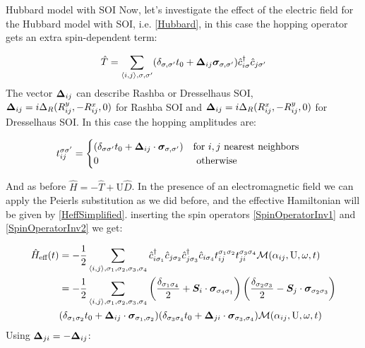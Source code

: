 \begin{section}{Hubbard model with SOI}
\label{Section3HubbardSOI}
Now, let's investigate the effect of the electric field for the Hubbard model with SOI, i.e. \ref{Hubbard}, in this case the hopping operator gets an extra spin-dependent term:

\begin{equation}
\hat{T} = \sum_{\langle i,j \rangle, \sigma, \sigma'}(\delta_{\sigma, \sigma'} t_0 + \boldsymbol{\Delta}_{ij} \boldsymbol{\sigma}_{\sigma, \sigma'})\hat{c}_{i \sigma}^\dagger \hat{c}_{j \sigma'}
\end{equation}
The vector $\boldsymbol{\Delta}_{ij}$ can describe Rashba or Dresselhaus SOI, $\boldsymbol{\Delta}_{ij} = i\Delta_R(R_{ij}^y, -R_{ij}^x, 0)$ for Rashba SOI and $\boldsymbol{\Delta}_{ij} = i\Delta_R(R_{ij}^x, -R_{ij}^y, 0)$ for Dresselhaus SOI. 
In this case the hopping amplitudes are:

\begin{equation}
\label{HoppHubbSOI}
t_{ij}^{\sigma \sigma'} = \begin{cases}
	(\delta_{\sigma \sigma'}t_0+\boldsymbol{\Delta}_{ij} \cdot \boldsymbol{\sigma}_{\sigma, \sigma'}) & \text{for } i, j \text{ nearest neighbors} \\
	0 & \text{ otherwise}
\end{cases} \quad
\end{equation}

And as before $\hat{H} = -\hat{T} + \text{U}\hat{D}$. In the presence of an electromagnetic field we can apply the Peierls substitution as we did before, and the effective Hamiltonian will be given by \ref{HeffSimplified}.  inserting the spin operators \ref{SpinOperatorInv1} and \ref{SpinOperatorInv2} we get:

\begin{align}
\hat{H}_{\text{eff}}(t) &= - \frac{1}{2} \sum_{\langle i,j \rangle, \sigma_1, \sigma_2, \sigma_3, \sigma_4}\hat{c}_{i \sigma_1}^\dagger \hat{c}_{j \sigma_2} \hat{c}_{j \sigma_3}^\dagger \hat{c}_{i \sigma_4} t_{ij}^{\sigma_1 \sigma_2} t_{ji}^{\sigma_3 \sigma_4} \mathcal{M}(\alpha_{ij}, \text{U}, \omega, t) \nonumber \\
&= - \frac{1}{2} \sum_{\langle i,j \rangle, \sigma_1, \sigma_2, \sigma_3, \sigma_4} \left( \frac{\delta_{\sigma_1 \sigma_4}}{2} + \boldsymbol{S}_i\cdot\boldsymbol{\sigma}_{\sigma_4 \sigma_1} \right) \left( \frac{\delta_{\sigma_2 \sigma_3}}{2} - \boldsymbol{S}_j\cdot\boldsymbol{\sigma}_{\sigma_2 \sigma_3} \right) \nonumber \\ &(\delta_{\sigma_1 \sigma_2}t_0+\boldsymbol{\Delta}_{ij}\cdot \boldsymbol{\sigma}_{\sigma_1, \sigma_2}) (\delta_{\sigma_3 \sigma_4}t_0+\boldsymbol{\Delta}_{ji}\cdot \boldsymbol{\sigma}_{\sigma_3, \sigma_4}) \mathcal{M}(\alpha_{ij}, \text{U}, \omega, t) \label{HeffHubbSOI1}
\end{align}
Using $\boldsymbol{\Delta}_{ji} = - \boldsymbol{\Delta}_{ij}$:


\end{section}
